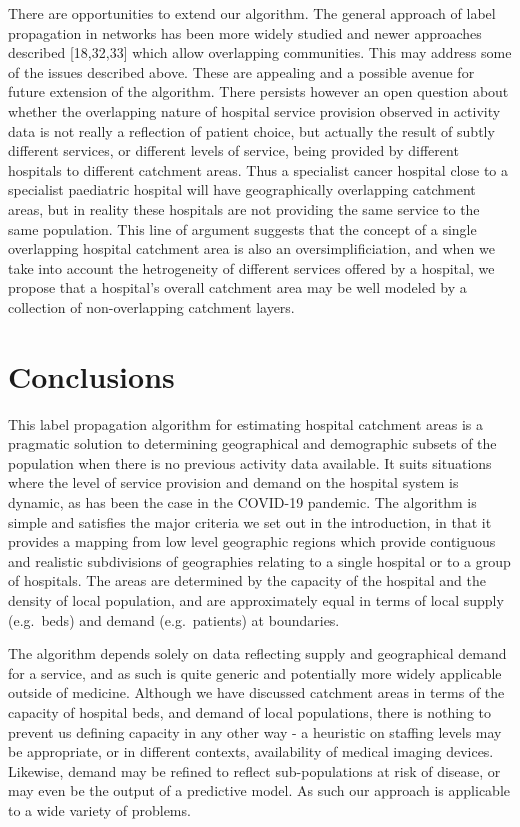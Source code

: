 \documentclass[
]{article}
\begin{document}
There are opportunities to extend our algorithm. The general approach of
label propagation in networks has been more widely studied and newer
approaches described {[}18,32,33{]} which allow overlapping communities.
This may address some of the issues described above. These are appealing
and a possible avenue for future extension of the algorithm. There
persists however an open question about whether the overlapping nature
of hospital service provision observed in activity data is not really a
reflection of patient choice, but actually the result of subtly
different services, or different levels of service, being provided by
different hospitals to different catchment areas. Thus a specialist
cancer hospital close to a specialist paediatric hospital will have
geographically overlapping catchment areas, but in reality these
hospitals are not providing the same service to the same population.
This line of argument suggests that the concept of a single overlapping
hospital catchment area is also an oversimplificiation, and when we take
into account the hetrogeneity of different services offered by a
hospital, we propose that a hospital's overall catchment area may be
well modeled by a collection of non-overlapping catchment layers.

\hypertarget{conclusions}{%
\section{Conclusions}\label{conclusions}}

This label propagation algorithm for estimating hospital catchment areas
is a pragmatic solution to determining geographical and demographic
subsets of the population when there is no previous activity data
available. It suits situations where the level of service provision and
demand on the hospital system is dynamic, as has been the case in the
COVID-19 pandemic. The algorithm is simple and satisfies the major
criteria we set out in the introduction, in that it provides a mapping
from low level geographic regions which provide contiguous and realistic
subdivisions of geographies relating to a single hospital or to a group
of hospitals. The areas are determined by the capacity of the hospital
and the density of local population, and are approximately equal in
terms of local supply (e.g.~beds) and demand (e.g.~patients) at
boundaries.

The algorithm depends solely on data reflecting supply and geographical
demand for a service, and as such is quite generic and potentially more
widely applicable outside of medicine. Although we have discussed
catchment areas in terms of the capacity of hospital beds, and demand of
local populations, there is nothing to prevent us defining capacity in
any other way - a heuristic on staffing levels may be appropriate, or in
different contexts, availability of medical imaging devices. Likewise,
demand may be refined to reflect sub-populations at risk of disease, or
may even be the output of a predictive model. As such our approach is
applicable to a wide variety of problems.
\end{document}
